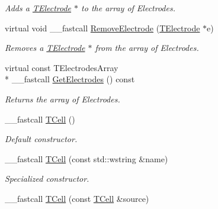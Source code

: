 \begin{DoxyCompactItemize}
\begin{DoxyCompactList}\small\item\em Adds a \hyperlink{class_t_electrode}{T\+Electrode} $\ast$ to the array of Electrodes. \end{DoxyCompactList}\item 
\hypertarget{class_t_cell_a75dcebc4e5e9e6363193931c286b61bf}{virtual void \+\_\+\+\_\+fastcall \hyperlink{class_t_cell_a75dcebc4e5e9e6363193931c286b61bf}{Remove\+Electrode} (\hyperlink{class_t_electrode}{T\+Electrode} $\ast$e)}\label{class_t_cell_a75dcebc4e5e9e6363193931c286b61bf}

\begin{DoxyCompactList}\small\item\em Removes a \hyperlink{class_t_electrode}{T\+Electrode} $\ast$ from the array of Electrodes. \end{DoxyCompactList}\item 
\hypertarget{class_t_cell_a87793cac2e21de67e5892363418f84f3}{virtual const T\+Electrodes\+Array \\*
\+\_\+\+\_\+fastcall \hyperlink{class_t_cell_a87793cac2e21de67e5892363418f84f3}{Get\+Electrodes} () const }\label{class_t_cell_a87793cac2e21de67e5892363418f84f3}

\begin{DoxyCompactList}\small\item\em Returns the array of Electrodes. \end{DoxyCompactList}\item 
\hypertarget{class_t_cell_a0d30cc0ed0f9f6e558011e5ee5b6abfd}{\+\_\+\+\_\+fastcall \hyperlink{class_t_cell_a0d30cc0ed0f9f6e558011e5ee5b6abfd}{T\+Cell} ()}\label{class_t_cell_a0d30cc0ed0f9f6e558011e5ee5b6abfd}

\begin{DoxyCompactList}\small\item\em Default constructor. \end{DoxyCompactList}\item 
\hypertarget{class_t_cell_ad5dd987fa88c278edf15aad34ffef153}{\+\_\+\+\_\+fastcall \hyperlink{class_t_cell_ad5dd987fa88c278edf15aad34ffef153}{T\+Cell} (const std\+::wstring \&name)}\label{class_t_cell_ad5dd987fa88c278edf15aad34ffef153}

\begin{DoxyCompactList}\small\item\em Specialized constructor. \end{DoxyCompactList}\item 
\hypertarget{class_t_cell_a1a02301a30115d7c52b5fdbb0e6fedf0}{\+\_\+\+\_\+fastcall \hyperlink{class_t_cell_a1a02301a30115d7c52b5fdbb0e6fedf0}{T\+Cell} (const \hyperlink{class_t_cell}{T\+Cell} \&source)}\label{class_t_cell_a1a02301a30115d7c52b5fdbb0e6fedf0}


\end{DoxyCompactItemize}
